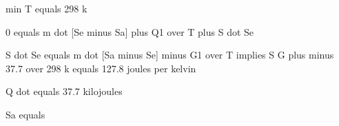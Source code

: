 min T equals 298 k

0 equals m dot [Se minus Sa] plus Q1 over T plus S dot Se

S dot Se equals m dot [Sa minus Se] minus G1 over T implies S G plus minus 37.7 over 298 k equals 127.8 joules per kelvin

Q dot equals 37.7 kilojoules

Sa equals